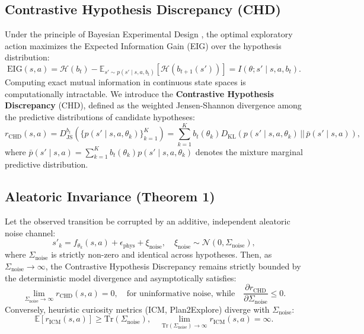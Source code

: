 \subsection{Contrastive Hypothesis Discrepancy (CHD)}
Under the principle of Bayesian Experimental Design \citep{lindley1956measure}, the optimal exploratory action maximizes the Expected Information Gain (EIG) over the hypothesis distribution:
\begin{equation}
    \text{EIG}(s, a) = \mathcal{H}(b_t) - \mathbb{E}_{s' \sim p(s' \mid s, a, b_t)} \left[ \mathcal{H}(b_{t+1}(s')) \right] = I(\theta; s' \mid s, a, b_t).
\end{equation}
Computing exact mutual information in continuous state spaces is computationally intractable. We introduce the \textbf{Contrastive Hypothesis Discrepancy} (CHD), defined as the weighted Jensen-Shannon divergence among the predictive distributions of candidate hypotheses:
\begin{equation}
    r_{\text{CHD}}(s, a) = D_{\text{JS}}^{b_t}\left( \{p(s' \mid s, a, \theta_k)\}_{k=1}^K \right) = \sum_{k=1}^K b_t(\theta_k) D_{\text{KL}}\left( p(s' \mid s, a, \theta_k) \,||\, \bar{p}(s' \mid s, a) \right),
\end{equation}
where $\bar{p}(s' \mid s, a) = \sum_{k=1}^K b_t(\theta_k) p(s' \mid s, a, \theta_k)$ denotes the mixture marginal predictive distribution.

\subsection{Aleatoric Invariance (Theorem 1)}

\begin{theorem}
\label{thm:noisy_tv}
Let the observed transition be corrupted by an additive, independent aleatoric noise channel:
\begin{equation}
    s'_{k} = f_{\theta_k}(s, a) + \epsilon_{\text{phys}} + \xi_{\text{noise}}, \quad \xi_{\text{noise}} \sim \mathcal{N}(0, \Sigma_{\text{noise}}),
\end{equation}
where $\Sigma_{\text{noise}}$ is strictly non-zero and identical across hypotheses. Then, as $\Sigma_{\text{noise}} \to \infty$, the Contrastive Hypothesis Discrepancy remains strictly bounded by the deterministic model divergence and asymptotically satisfies:
\begin{equation}
    \lim_{\Sigma_{\text{noise}} \to \infty} r_{\text{CHD}}(s, a) = 0, \quad \text{for uninformative noise, while} \quad \frac{\partial r_{\text{CHD}}}{\partial \Sigma_{\text{noise}}} \le 0.
\end{equation}
Conversely, heuristic curiosity metrics (ICM, Plan2Explore) diverge with $\Sigma_{\text{noise}}$:
\begin{equation}
    \mathbb{E}[r_{\text{ICM}}(s, a)] \ge \text{Tr}(\Sigma_{\text{noise}}), \quad \lim_{\text{Tr}(\Sigma_{\text{noise}}) \to \infty} r_{\text{ICM}}(s, a) = \infty.
\end{equation}
\end{theorem}

